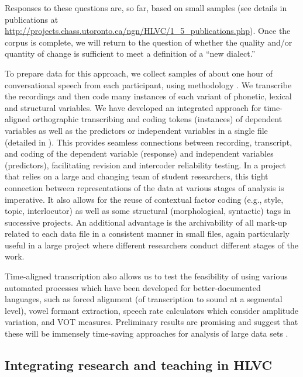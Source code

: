 \documentclass[output=paper]{LSP/langsci}
\begin{document}
\largerpage[-1]
Responses to these questions are, so far, based on small samples (see details in publications at \url{http://projects.chass.utoronto.ca/ngn/HLVC/1\_5\_publications.php}). Once the corpus is complete, we will return to the question of whether the quality and/or quantity of change is sufficient to meet a definition of a “new dialect.”

To prepare data for this approach, we collect samples of about one hour of conversational speech from each participant, using  methodology \citep{labov_field_1984}. We transcribe the recordings and then code many instances of each variant of phonetic, lexical and structural variables. We have developed an integrated approach for time-aligned orthographic transcribing and coding tokens (instances) of dependent variables as well as the predictors or independent variables in a single file (detailed in \citealt{nagy_extending_2015}). This provides seamless connections between recording, transcript, and coding of the dependent variable (response) and independent variables (predictors), facilitating revision and intercoder reliability testing. In a project that relies on a large and changing team of student researchers, this tight connection between representations of the data at various stages of analysis is imperative. It also allows for the reuse of contextual factor coding (e.g., style, topic, interlocutor) as well as some structural (morphological, syntactic) tags in successive projects. An additional advantage is the archivability of all mark-up related to each data file in a consistent manner in small files, again particularly useful in a large project where different researchers conduct different stages of the work. 

Time-aligned transcription also allows us to test the feasibility of using various automated processes which have been developed for better-documented languages, such as forced alignment (of transcription to sound at a segmental level), vowel formant extraction, speech rate calculators which consider amplitude variation, and VOT measures. Preliminary results are promising and suggest that these will be immensely time-saving approaches for analysis of large data sets \citep{tse_exploring_2014}.

\subsection{Integrating research and teaching in HLVC}
\end{document}
